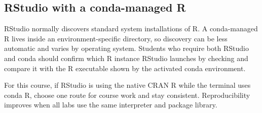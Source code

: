 \subsection{RStudio with a conda-managed R}

RStudio normally discovers standard system installations of R. A conda-managed R lives inside an environment-specific directory, so discovery can be less automatic and varies by operating system. Students who require both RStudio and conda should confirm which R instance RStudio launches by checking  and compare it with the R executable shown by the activated conda environment.

For this course, if RStudio is using the native CRAN R while the terminal uses conda R, choose one route for course work and stay consistent. Reproducibility improves when all labs use the same interpreter and package library.